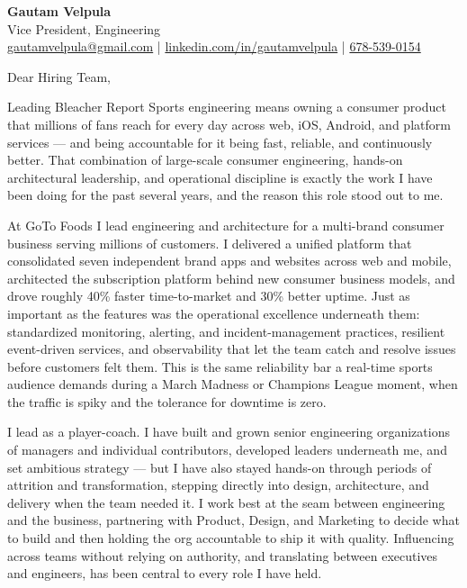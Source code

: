 \documentclass[11pt]{article}
\begin{document}
\begin{center}
    {\LARGE \textbf{Gautam Velpula}} \\[4pt]
    Vice President, Engineering \\[6pt]
    \href{mailto:gautamvelpula@gmail.com}{gautamvelpula@gmail.com} \;|\;
    \href{https://www.linkedin.com/in/gautamvelpula}{linkedin.com/in/gautamvelpula} \;|\;
    \href{tel:6785390154}{678-539-0154}
\end{center}

\hrulefill

\vspace{12pt}

Dear Hiring Team,

Leading Bleacher Report Sports engineering means owning a consumer product that millions of fans reach for every day across web, iOS, Android, and platform services --- and being accountable for it being fast, reliable, and continuously better. That combination of large-scale consumer engineering, hands-on architectural leadership, and operational discipline is exactly the work I have been doing for the past several years, and the reason this role stood out to me.

At GoTo Foods I lead engineering and architecture for a multi-brand consumer business serving millions of customers. I delivered a unified platform that consolidated seven independent brand apps and websites across web and mobile, architected the subscription platform behind new consumer business models, and drove roughly 40\% faster time-to-market and 30\% better uptime. Just as important as the features was the operational excellence underneath them: standardized monitoring, alerting, and incident-management practices, resilient event-driven services, and observability that let the team catch and resolve issues before customers felt them. This is the same reliability bar a real-time sports audience demands during a March Madness or Champions League moment, when the traffic is spiky and the tolerance for downtime is zero.

I lead as a player-coach. I have built and grown senior engineering organizations of managers and individual contributors, developed leaders underneath me, and set ambitious strategy --- but I have also stayed hands-on through periods of attrition and transformation, stepping directly into design, architecture, and delivery when the team needed it. I work best at the seam between engineering and the business, partnering with Product, Design, and Marketing to decide what to build and then holding the org accountable to ship it with quality. Influencing across teams without relying on authority, and translating between executives and engineers, has been central to every role I have held.
\end{document}
